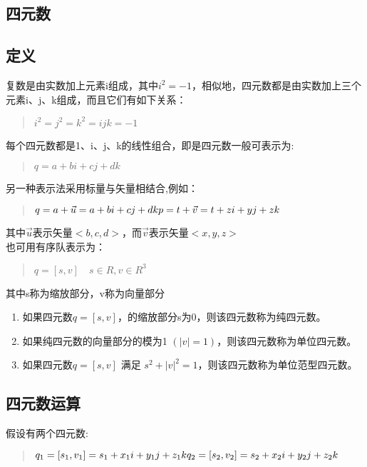 \documentclass[a4paper,10pt]{article}
\begin{document}
\begin{CJK}{UTF8}{song}
\section{四元数}
\subsection{定义}
复数是由实数加上元素i组成，其中$i^{2}=-1$，相似地，四元数都是由实数加上三个元素i、j、k组成，而且它们有如下关系：
\begin{quote}
\begin{math}
i^{2}=j^{2}=k^{2}=ijk=-1 
\end{math}
\end{quote}
每个四元数都是1、i、j、k的线性组合，即是四元数一般可表示为:
\begin{quote}
$q=a+bi+cj+dk$
\end{quote}
另一种表示法采用标量与矢量相结合,例如：
\begin{quote}
\begin{math}
q=a+\vec{u}=a+bi+cj+dk \\
p=t+\vec{v}=t+zi+yj+zk
\end{math}
\end{quote}
其中$\vec{u}$表示矢量$<b,c,d>$，而$\vec{v}$表示矢量$<x,y,z>$ \\
也可用有序队表示为：
\begin{quote}
\begin{math}
q=[s,v] \quad s\in{}R, v\in{}R^3
\end{math}
\end{quote}
其中s称为缩放部分，v称为向量部分
\begin{enumerate}
\item 如果四元数$q=[s,v]$，的缩放部分s为0，则该四元数称为纯四元数。
\item 如果纯四元数的向量部分的模为1 $( |v|=1 ) $，则该四元数称为单位四元数。
\item 如果四元数$q=[s,v]$ 满足 $s^2+|v|^2=1$，则该四元数称为单位范型四元数。
\end{enumerate}

\subsection{四元数运算}
假设有两个四元数:
\begin{quote}
\begin{math}
q_{1}=[s_{1},v_{1}]= s_{1}+x_{1}i+y_{1}j+z_{1}k \\
q_{2}=[s_{2},v_{2}]= s_{2}+x_{2}i+y_{2}j+z_{2}k \\
\end{math}
\end{quote}

\end{CJK}
\end{document}
